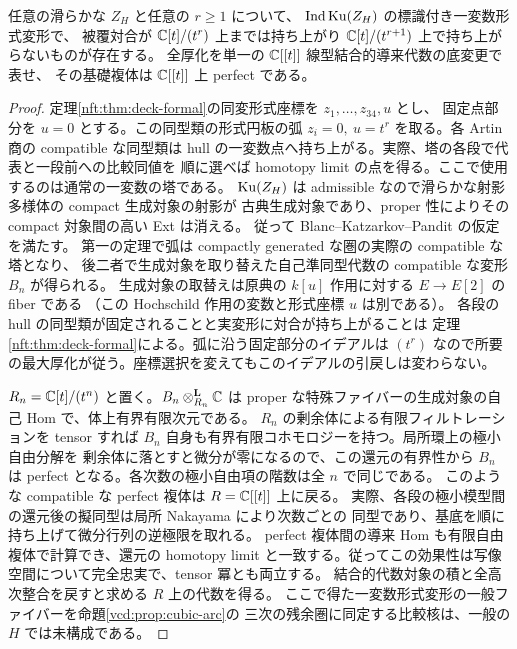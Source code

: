 \begin{proposition}[表示を指定しない次数一三様体での法方向の形式実現]
\label{vcd:prop:formal-contact}
任意の滑らかな $Z_H$ と任意の $r\ge1$ について、
$\operatorname{Ind}\operatorname{Ku}(Z_H)$ の標識付き一変数形式変形で、
被覆対合が $\mathbb C[t]/(t^r)$ 上までは持ち上がり
$\mathbb C[t]/(t^{r+1})$ 上で持ち上がらないものが存在する。
全厚化を単一の $\mathbb C[[t]]$ 線型結合的導来代数の底変更で表せ、
その基礎複体は $\mathbb C[[t]]$ 上 perfect である。
\end{proposition}
\begin{proof}
定理\ref{nft:thm:deck-formal}の同変形式座標を $z_1,\ldots,z_{34},u$ とし、
固定点部分を $u=0$ とする。この同型類の形式円板の弧
$z_i=0,\ u=t^r$ を取る。各 Artin 商の compatible な同型類は
hull の一変数点へ持ち上がる。実際、塔の各段で代表と一段前への比較同値を
順に選べば homotopy limit の点を得る。ここで使用するのは通常の一変数の塔である。
$\operatorname{Ku}(Z_H)$ は admissible なので滑らかな射影多様体の compact 生成対象の射影が
古典生成対象であり、proper 性によりその compact 対象間の高い Ext は消える。
従って Blanc--Katzarkov--Pandit
\cite[Theorem~4.27, Proposition~4.28, Theorem~4.29]{NFBKP}の仮定を満たす。
第一の定理で弧は compactly generated な圏の実際の compatible な塔となり、
後二者で生成対象を取り替えた自己準同型代数の compatible な変形 $B_n$ が得られる。
生成対象の取替えは原典の $k[u]$ 作用に対する $E\to E[2]$ の fiber である
（この Hochschild 作用の変数と形式座標 $u$ は別である）。
各段の hull の同型類が固定されることと実変形に対合が持ち上がることは
定理\ref{nft:thm:deck-formal}による。弧に沿う固定部分のイデアルは $(t^r)$
なので所要の最大厚化が従う。座標選択を変えてもこのイデアルの引戻しは変わらない。

$R_n=\mathbb C[t]/(t^n)$ と置く。$B_n\otimes_{R_n}^{\mathbf L}\mathbb C$ は
proper な特殊ファイバーの生成対象の自己 Hom で、体上有界有限次元である。
$R_n$ の剰余体による有限フィルトレーションを tensor すれば
$B_n$ 自身も有界有限コホモロジーを持つ。局所環上の極小自由分解を
剰余体に落とすと微分が零になるので、この還元の有界性から $B_n$ は perfect
となる。各次数の極小自由項の階数は全 $n$ で同じである。
このような compatible な perfect 複体は $R=\mathbb C[[t]]$ 上に戻る。
実際、各段の極小模型間の還元後の擬同型は局所 Nakayama により次数ごとの
同型であり、基底を順に持ち上げて微分行列の逆極限を取れる。
perfect 複体間の導来 Hom も有限自由複体で計算でき、還元の homotopy limit
と一致する。従ってこの効果性は写像空間について完全忠実で、tensor 冪とも両立する。
結合的代数対象の積と全高次整合を戻すと求める $R$ 上の代数を得る。
ここで得た一変数形式変形の一般ファイバーを命題\ref{vcd:prop:cubic-arc}の
三次の残余圏に同定する比較核は、一般の $H$ では未構成である。
\end{proof}

